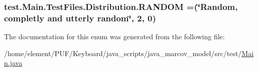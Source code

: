 \subsubsection[{\texorpdfstring{R\+A\+N\+D\+OM}{RANDOM}}]{\setlength{\rightskip}{0pt plus 5cm}test.\+Main.\+Test\+Files.\+Distribution.\+R\+A\+N\+D\+OM =(\char`\"{}Random, completly and utterly random\char`\"{}, 2, 0)}\hypertarget{enumtest_1_1_main_1_1_test_files_1_1_distribution_a5aab7ec6b569f40c80559ab94adbbcbc}{}\label{enumtest_1_1_main_1_1_test_files_1_1_distribution_a5aab7ec6b569f40c80559ab94adbbcbc}


The documentation for this enum was generated from the following file\+:\begin{DoxyCompactItemize}
\item 
/home/element/\+P\+U\+F/\+Keyboard/java\+\_\+scripts/java\+\_\+marcov\+\_\+model/src/test/\hyperlink{_main_8java}{Main.\+java}\end{DoxyCompactItemize}
